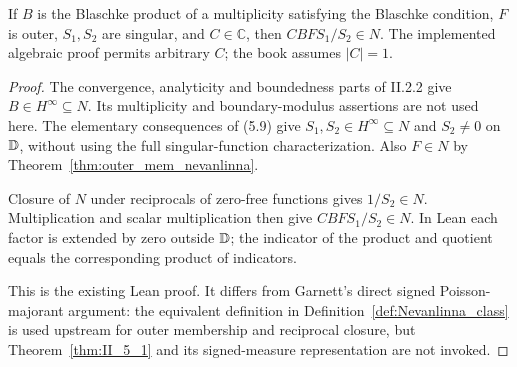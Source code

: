 \begin{theorem}
  \label{thm:nevanlinna_factorization_converse}
  \leanok
  \mainline
  If $B$ is the Blaschke product of a multiplicity satisfying the Blaschke
  condition, $F$ is outer, $S_1,S_2$ are singular, and $C\in\mathbb C$, then
  $CBFS_1/S_2\in N$. The implemented algebraic proof permits arbitrary $C$;
  the book assumes $|C|=1$.
  \begin{proof}
    \leanok
    The convergence, analyticity and boundedness parts of II.2.2 give
    $B\in H^\infty\subseteq N$. Its multiplicity and boundary-modulus assertions
    are not used here. The elementary consequences of (5.9) give
    $S_1,S_2\in H^\infty\subseteq N$ and $S_2\ne0$ on $\mathbb{D}$, without using the
    full singular-function characterization. Also $F\in N$ by
    Theorem~\ref{thm:outer_mem_nevanlinna}.

    Closure of $N$ under reciprocals of zero-free functions gives $1/S_2\in N$.
    Multiplication and scalar multiplication then give $CBFS_1/S_2\in N$.
    In Lean each factor is extended by zero outside $\mathbb{D}$; the indicator of
    the product and quotient equals the corresponding product of indicators.

    This is the existing Lean proof. It differs from Garnett's direct signed
    Poisson-majorant argument: the equivalent definition in Definition~\ref{def:Nevanlinna_class} is used upstream for
    outer membership and reciprocal closure, but Theorem~\ref{thm:II_5_1}
    and its signed-measure representation are not invoked.
  \end{proof}
\end{theorem}
